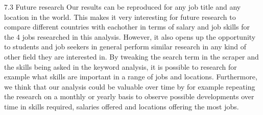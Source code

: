 \documentclass[
]{article}
\begin{document}
7.3 Future research Our results can be reproduced for any job title and
any location in the world. This makes it very interesting for future
research to compare different countries with eachother in terms of
salary and job skills for the 4 jobs researched in this analysis.
However, it also opens up the opportunity to students and job seekers in
general perform similar research in any kind of other field they are
interested in. By tweaking the search term in the scraper and the skills
being asked in the keyword analysis, it is possible to research for
example what skills are important in a range of jobs and locations.
Furthermore, we think that our analysis could be valuable over time by
for example repeating the research on a monthly or yearly basis to
observe possible developments over time in skills required, salaries
offered and locations offering the most jobs.
\end{document}
